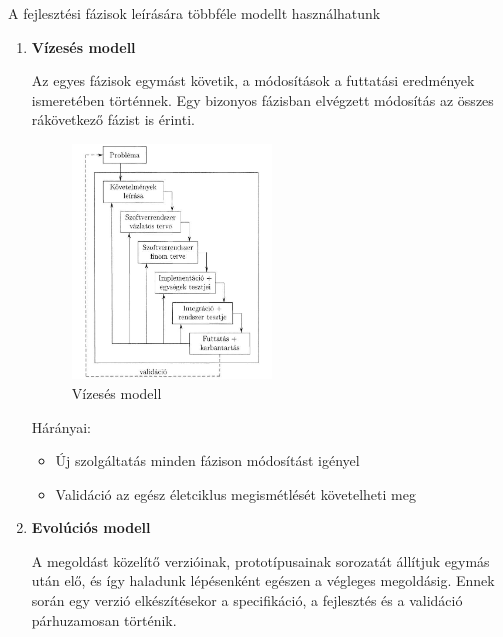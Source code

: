 \documentclass[12pt,margin=0px]{article}
\begin{document}
		A fejlesztési fázisok leírására többféle modellt használhatunk
		\begin{enumerate}
			\item \textbf{Vízesés modell}
			
				Az egyes fázisok egymást követik, a
				módosítások a futtatási eredmények ismeretében történnek. Egy bizonyos
				fázisban elvégzett módosítás az összes rákövetkező fázist is érinti.
				
				\begin{figure}[H]
					\centering
					\includegraphics[width=0.5\textwidth]{img/vizeses.png}
					\caption{Vízesés modell}
					\label{fig:vizeses}
				\end{figure}
				
				Hárányai:
					\begin{itemize}
						\item Új szolgáltatás minden fázison módosítást igényel
						\item Validáció az egész életciklus megismétlését követelheti meg
					\end{itemize}
			\item \textbf{Evolúciós modell}
			
				A megoldást közelítő verzióinak, prototípusainak sorozatát
				állítjuk egymás után elő, és így haladunk lépésenként egészen a végleges
				megoldásig. Ennek során egy verzió elkészítésekor a specifikáció, a fejlesztés és a validáció párhuzamosan történik.
				

\end{enumerate}
\end{document}
